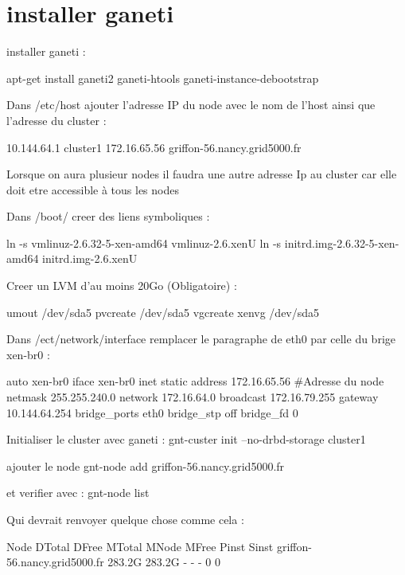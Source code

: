 \section{installer ganeti}


installer ganeti :

apt-get install ganeti2 ganeti-htools ganeti-instance-debootstrap

Dans /etc/host ajouter l'adresse IP du node avec le nom de l'host ainsi que l'adresse du cluster :

10.144.64.1 cluster1
172.16.65.56 griffon-56.nancy.grid5000.fr

Lorsque on aura plusieur nodes il faudra une autre adresse Ip au cluster car elle doit etre accessible à tous les nodes

Dans /boot/ creer des liens symboliques :

ln -s vmlinuz-2.6.32-5-xen-amd64 vmlinuz-2.6.xenU
ln -s initrd.img-2.6.32-5-xen-amd64 initrd.img-2.6.xenU


Creer un LVM d'au moins 20Go (Obligatoire) :

umout /dev/sda5
pvcreate /dev/sda5
vgcreate xenvg /dev/sda5

Dans /ect/network/interface remplacer le paragraphe de eth0 par celle du brige xen-br0 :

auto xen-br0
iface xen-br0 inet static
 address 172.16.65.56 #Adresse du node
 netmask 255.255.240.0 
 network 172.16.64.0
 broadcast 172.16.79.255
 gateway 10.144.64.254
 bridge_ports eth0
 bridge_stp off
 bridge_fd 0
 

Initialiser le cluster avec ganeti :
gnt-custer init --no-drbd-storage cluster1

ajouter le node
gnt-node add griffon-56.nancy.grid5000.fr

et verifier avec :
gnt-node list

Qui devrait renvoyer quelque chose comme cela :

Node                         DTotal  DFree MTotal MNode MFree Pinst Sinst
griffon-56.nancy.grid5000.fr 283.2G 283.2G      -     -     -     0     0


